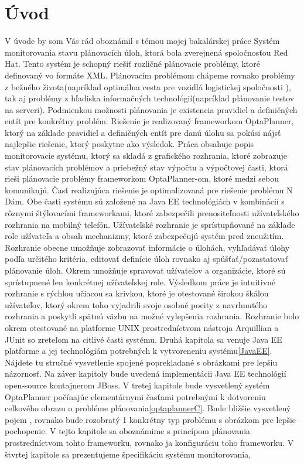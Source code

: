 

\chapter{Úvod}
V úvode by som Vás rád oboznámil s témou mojej bakalárskej práce Systém monitorovania stavu plánovacích úloh, ktorá bola zverejnená spoločnosťou Red Hat. Tento systém je schopný riešiť rozličné plánovacie problémy, ktoré definovaný vo formáte XML. Plánovacím problémom chápeme rovnako problémy z bežného života(napríklad optimálna cesta pre vozidlá logistickej spoločnosti ), tak aj problémy z hľadiska informačných technológií(napríklad plánovanie testov na serveri). Podmienkou možnosti plánovania je existencia pravidiel a definičných entít pre konkrétny problém. Riešenie je realizovaný frameworkom OptaPlanner, ktorý na základe pravidiel a definičných entít pre danú úlohu sa pokúsi nájsť najlepšie riešenie, ktorý poskytne ako výsledok. Práca obsahuje popis monitorovacie systému, ktorý sa skladá z grafického rozhrania, ktoré zobrazuje stav plánovacích problémov a priebežný stav výpočtu a výpočtovej časti, ktorá rieši plánovacie problémy frameworkom OptaPlanner-om, ktoré medzi sebou komunikujú. Časť realizujúca riešenie je optimalizovaná pre riešenie problému N Dám. Obe časti systému sú založené na Java EE technológiách v kombinácií s rôznymi štýlovacími frameworkami, ktoré zabezpečili prenositeľnosti užívateľského rozhrania na mobilný telefón. Užívateľské rozhranie je sprístupňované na základe role užívateľa a obsah mechanizmy, ktoré zabezpečujú systém pred zneužitím. \newline \indent Rozhranie obecne umožňuje zobrazovať informácie o úlohách, vyhľadávať úlohy podľa určitého kritéria, editovať definície úloh rovnako aj spúšťať/pozastatovať plánovanie úloh. Okrem umožňuje spravovať užívateľov a organizácie, ktoré sú sprístupnené len konkrétnej užívateľskej role. Výsledkom práce je intuitivné rozhranie s rýchlou učiacou sa krivkou, ktoré je otestované širokou škálou užívateľov, ktorý okrem toho vyjadrili svoje osobné pocity z navrhnutého rozhrania a poskytli spätnú väzbu na možné vylepšenia rozhrania. Rozhranie bolo okrem otestované na platforme UNIX prostredníctvom nástroja Arquillian a JUnit so zreteľom na citlivé časti systému. \newline \indent Druhá kapitola sa venuje Java EE platforme a jej technológiám potrebných k vytvoreneniu systému\ref{JavaEE}. Nájdete tu stručné vysvetlenie spojené poprekladané s obrázkami pre lepšiu názornosť. Na záver kapitoly bude uvedená implementácii Java EE technológií open-source kontajnerom JBoss. \newline \indent V tretej kapitole bude vysvetlený systém OptaPlanner počínajúc elementárnymi časťami potrebnými k dotvoreniu celkového obrazu o probléme plánovania\ref{optaplannerC}. Bude bližšie vysvetlený pojem , rovnako bude rozobratý 1 konkrétny typ problému s obrázkom pre lepšie pochopenie. V tejto kapitole sa oboznámime s princípom plánovania prostredníctvom tohto frameworku, rovnako ja konfiguráciu toho frameworku. \newline \indent V štvrtej kapitole sa prezentujeme špecifikáciu systému monitorovania, 